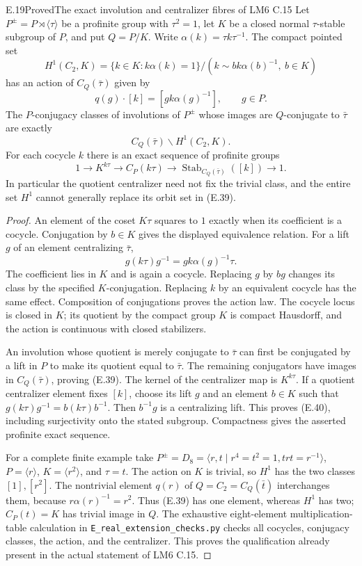 \begin{result}{E.19}{Proved}{The exact involution and centralizer fibres of LM6 C.15}
Let $P^{\pm}=P\rtimes\langle\tau\rangle$ be a profinite
group with $\tau^2=1$, let $K$ be a closed normal
$\tau$-stable subgroup of $P$, and put $Q=P/K$.
Write $\alpha(k)=\tau k\tau^{-1}$.  The compact pointed set
\[
 H^1(C_2,K)=
 \{k\in K:k\alpha(k)=1\}/
       (k\sim b k\alpha(b)^{-1},\ b\in K)
\]
has an action of $C_Q(\bar\tau)$ given by
\[
 q(g)\cdot[k]=[g k\alpha(g)^{-1}],\qquad g\in P.               \tag{E.38}
\]
The $P$-conjugacy classes of involutions of $P^{\pm}$ whose
images are $Q$-conjugate to $\bar\tau$ are exactly
\[
 C_Q(\bar\tau)\backslash H^1(C_2,K).                           \tag{E.39}
\]
For each cocycle $k$ there is an exact sequence of profinite
groups
\[
 1\longrightarrow K^{k\tau}\longrightarrow C_P(k\tau)
 \longrightarrow\operatorname{Stab}_{C_Q(\bar\tau)}([k])
 \longrightarrow1.                                           \tag{E.40}
\]
In particular the quotient centralizer need not fix the
trivial class, and the entire set $H^1$ cannot generally
replace its orbit set in (E.39).
\end{result}
\begin{proof}
An element of the coset $K\tau$ squares to $1$ exactly
when its coefficient is a cocycle.  Conjugation by $b\in K$
gives the displayed equivalence relation.  For a lift $g$
of an element centralizing $\bar\tau$,
\[
 g(k\tau)g^{-1}=gk\alpha(g)^{-1}\tau.
\]
The coefficient lies in $K$ and is again a cocycle.
Replacing $g$ by $bg$ changes its class by the specified
$K$-conjugation.  Replacing $k$ by an equivalent cocycle
has the same effect.  Composition of conjugations proves
the action law.  The cocycle locus is closed in $K$;
its quotient by the compact group $K$ is compact Hausdorff,
and the action is continuous with closed stabilizers.

An involution whose quotient is merely conjugate to
$\bar\tau$ can first be conjugated by a lift in $P$ to
make its quotient equal to $\bar\tau$.  The remaining
conjugators have images in $C_Q(\bar\tau)$, proving
(E.39).  The kernel of the centralizer map is $K^{k\tau}$.
If a quotient centralizer element fixes $[k]$, choose its
lift $g$ and an element $b\in K$ such that
$g(k\tau)g^{-1}=b(k\tau)b^{-1}$.  Then $b^{-1}g$ is a
centralizing lift.  This proves (E.40), including
surjectivity onto the stated subgroup.  Compactness gives
the asserted profinite exact sequence.

For a complete finite example take
$P^{\pm}=D_8=\langle r,t\mid r^4=t^2=1,trt=r^{-1}\rangle$,
$P=\langle r\rangle$, $K=\langle r^2\rangle$, and
$\tau=t$.  The action on $K$ is trivial, so $H^1$ has the
two classes $[1],[r^2]$.  The nontrivial element $q(r)$ of
$Q=C_2=C_Q(\bar t)$ interchanges them, because
$r\alpha(r)^{-1}=r^2$.  Thus (E.39) has one element,
whereas $H^1$ has two; $C_P(t)=K$ has trivial image in
$Q$.  The exhaustive eight-element multiplication-table
calculation in \texttt{E\_real\_extension\_checks.py} checks
all cocycles, conjugacy classes, the action, and the
centralizer.  This proves the qualification already
present in the actual statement of LM6 C.15.
\end{proof}

